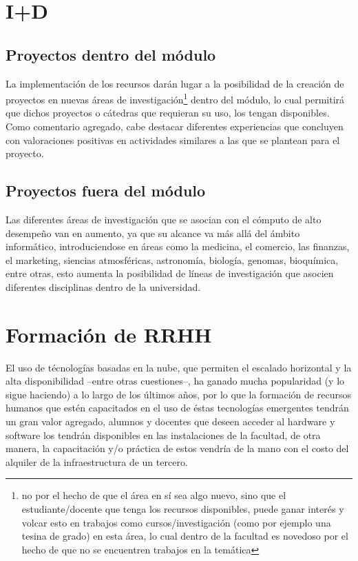\documentclass{article}
\begin{document}
\section{I+D}%
\label{sec:i_d}

\subsection{Proyectos dentro del módulo}%
\label{sub:proyectos_dentro_del_modulo}
La implementación de los recursos darán lugar a la posibilidad de la creación
de proyectos en
nuevas áreas de investigación\footnote{no por el hecho de que el área en sí
sea algo nuevo, sino que el estudiante/docente que tenga los recursos
disponibles, puede ganar interés y volcar esto en trabajos como cursos/investigación (como por
ejemplo una tesina de grado) en esta área, lo cual dentro de la facultad es novedoso
por el hecho de que no se encuentren trabajos en la temática}
dentro del módulo, lo cual permitirá que dichos proyectos o cátedras que
requieran su uso, los tengan disponibles. Como comentario agregado, cabe
destacar diferentes experiencias que concluyen con valoraciones positivas
en actividades similares\cite{caliz2015,haroon2016,lv2016,bhatia2018,yang2018}
a las que se plantean para el proyecto.

\subsection{Proyectos fuera del módulo}%
\label{sub:proyectos_fuera_del_modulo}
Las diferentes áreas de investigación que se asocian con el cómputo de alto
desempeño van en aumento, ya que su alcance va más allá del ámbito informático,
introduciendose en áreas como la medicina, el comercio, las finanzas, el
marketing, siencias atmosféricas, astronomía, biología, genomas, bioquímica,
entre otras\cite{khan2014, saranya2015, mondal2015}, esto aumenta la
posibilidad de líneas de investigación que asocien diferentes disciplinas
dentro de la universidad.

\section{Formación de RRHH}%
\label{sec:formacion_de_rrhh}
El uso de técnologías basadas en la nube, que permiten el escalado horizontal y
la alta disponibilidad --entre otras cuestiones--, ha ganado mucha popularidad
(y lo sigue haciendo\cite{harper2019}) a lo largo de los últimos años\cite{m-23},
por lo que la formación de recursos humanos que estén capacitados en el uso de
éstas tecnologías emergentes tendrán un gran valor agregado, alumnos y docentes
que deseen acceder al hardware y software los tendrán disponibles en las
instalaciones de la facultad, de otra manera, la capacitación y/o práctica de
estos vendría de la mano con el costo del alquiler de la
infraestructura de un tercero\cite{aws, gce, ibm-cloud}.
\end{document}
